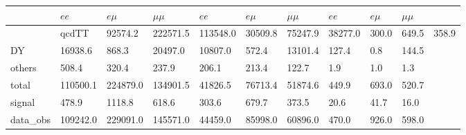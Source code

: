 \documentclass{article}
\begin{document}
\begin{landscape}
\begin{table}[!h]
\begin{tabular}{l||l|l|l||l|l|l||l|l|l|}
& $ee$ & $e\mu$ & $\mu\mu$ & $ee$ & $e\mu$ & $\mu\mu$ & $ee$ & $e\mu$ & $\mu\mu$ \\ \hline 
 & qcdTT &         92574.2 &        222571.5 &        113548.0 &         30509.8 &         75247.9 &         38277.0 &           300.0 &           649.5 &           358.9\\ \hline 
{}DY &         16938.6 &           868.3 &         20497.0 &         10807.0 &           572.4 &         13101.4 &           127.4 &             0.8 &           144.5\\ \hline 
{}others &           508.4 &           320.4 &           237.9 &           206.1 &           213.4 &           122.7 &             1.9 &             1.0 &             1.3\\ \hline 
{}total &        110500.1 &        224879.0 &        134901.5 &         41826.5 &         76713.4 &         51874.6 &           449.9 &           693.0 &           520.7\\ \hline 
{}signal &           478.9 &          1118.8 &           618.6 &           303.6 &           679.7 &           373.5 &            20.6 &            41.7 &            16.0\\ \hline 
{}data_obs &        109242.0 &        229091.0 &        145571.0 &         44459.0 &         85998.0 &         60896.0 &           470.0 &           926.0 &           598.0\\ \hline 
\end{tabular}
\end{table}
\end{landscape}
\end{document}
